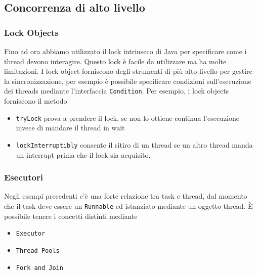\documentclass{article}
\begin{document}
\subsection{Concorrenza di alto livello}

\subsubsection{Lock Objects}
Fino ad ora abbiamo utilizzato il lock intrinseco di Java per specificare come i thread devono interagire. Questo lock \`e facile da utilizzare ma ha molte limitazioni. I lock object forniscono degli strumenti di pi\`u alto livello per gestire la sincronizzazione, per esempio \`e possibile specificare condizioni sull'esecuzione dei threads mediante l'interfaccia \texttt{Condition}. Per esempio,  i lock objects forniscono il metodo
\begin{itemize}
\item \texttt{tryLock}  prova a prendere il lock,  se non lo ottiene continua l'esecuzione invece di mandare il thread in wait
\item \texttt{lockInterruptibly} consente il ritiro di un thread se un altro thread manda un interrupt prima che il lock sia acquisito.
\end{itemize}

\subsubsection{Esecutori}
Negli esempi precedenti c'\`e una forte relazione tra task e thread, dal momento che il task deve essere un \texttt{Runnable} ed istanziato mediante un oggetto thread. \`E possibile tenere i concetti distinti mediante 
\begin{itemize}
\item \texttt{Executor}
\item \texttt{Thread Pools}
\item \texttt{Fork and Join}
\end{itemize}
\end{document}
